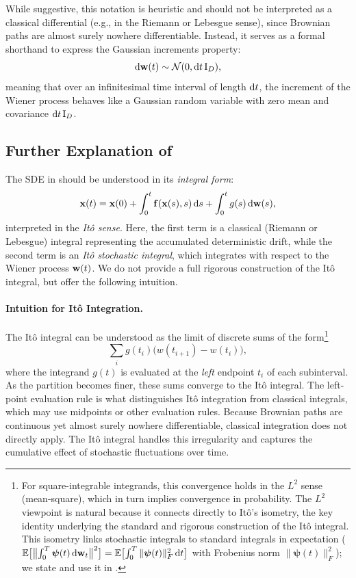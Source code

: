 While suggestive, this notation is heuristic and should not be interpreted as a classical differential (e.g., in the Riemann or Lebesgue sense), since Brownian paths are almost surely nowhere differentiable. Instead, it serves as a formal shorthand to express the Gaussian increments property:
\[
\mathop{}\!\mathrm{d} {\mathbf{w}}(t) \sim \mathcal{N}(0, \mathop{}\!\mathrm{d} t\, \mathrm{I}_D),
\]
meaning that over an infinitesimal time interval of length $ \mathop{}\!\mathrm{d} t $, the increment of the Wiener process behaves like a Gaussian random variable with zero mean and covariance $ \mathop{}\!\mathrm{d} t\, \mathrm{I}_D $.




\subsection{Further Explanation of }
The SDE in  should be understood in its \emph{integral form}:
\begin{align}\label{eq:sde-integral-form}
    {\mathbf{x}}(t) = {\mathbf{x}}(0) + \int_0^t {\mathbf{f}}({\mathbf{x}}(s), s) \mathop{}\!\mathrm{d} s + \int_0^t g(s) \mathop{}\!\mathrm{d} {\mathbf{w}}(s),
\end{align}
interpreted in the \emph{Itô sense}.
Here, the first term is a classical (Riemann or Lebesgue) integral representing the accumulated deterministic drift, while the second term is an \emph{Itô stochastic integral}, which integrates with respect to the Wiener process $ {\mathbf{w}}(t) $. We do not provide a full rigorous construction of the Itô integral, but offer the following intuition.


\paragraph{Intuition for It\^o Integration.}
The It\^o integral can be understood as the limit of discrete sums of
the form\footnote{For square-integrable integrands, this convergence holds in the $L^2$ sense (mean-square), which in turn implies convergence in probability. The $L^2$ viewpoint is natural because it connects directly to It\^o's isometry, the key identity underlying the standard and rigorous construction of the It\^o integral. This isometry links stochastic integrals to standard integrals in expectation ($\mathbb{E}\bigl[\bigl\|\int_0^T \bm{\psi}(t)\,\mathrm{d}{\mathbf{w}}_t \bigr\|^2\bigr] = \mathbb{E}\bigl[\int_0^T \|\bm{\psi}(t)\|_F^2\,\mathrm{d}t\bigr]$ with Frobenius norm
$\|\bm{\psi}(t)\|_F^2$); we state and use it in .}
\[
\sum_i g(t_i)\bigl(w(t_{i+1})-w(t_i)\bigr),
\]
where the integrand $g(t)$ is evaluated at the \emph{left} endpoint
$t_i$ of each subinterval. As the partition becomes finer, these sums
converge to the It\^o integral. The left-point evaluation rule is what
distinguishes It\^o integration from classical integrals, which may use
midpoints or other evaluation rules. Because Brownian paths are
continuous yet almost surely nowhere differentiable, classical
integration does not directly apply. The It\^o integral handles this
irregularity and captures the cumulative effect of stochastic
fluctuations over time.

